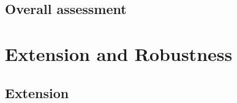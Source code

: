 \documentclass[12pt,a4paper]{article}
\newcommand{\tablenotes}[1]{\par\vspace{4pt}{\footnotesize\textit{Notes:} #1\par}}
\begin{document}


%   

\subsection{Overall assessment}



\section{Extension and Robustness}

\subsection{Extension}\label{sec:extension}





\end{document}
